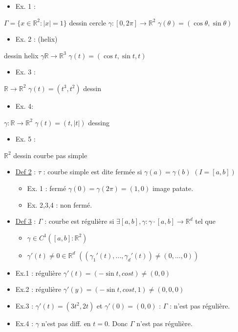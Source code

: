 \documentclass[11pt]{article}
\begin{document}
\begin{itemize}
\item Ex. 1 :
\end{itemize}
\(\Gamma = \{ x \in \mathbb{R}^2 : |x|=1\}\)
dessin cercle \(\gamma: \left[0,2\pi\right] \rightarrow \mathbb{R}^2\) \(\gamma(\theta) = (\cos \theta, \sin \theta)\)
\begin{itemize}
\item Ex. 2 : (helix)
\end{itemize}
dessin helix \(\gamma \mathbb{R} \rightarrow \mathbb{R}^3\) \(\gamma(t) = (\cos t, \sin t,t)\)
\begin{itemize}
\item Ex. 3 :
\end{itemize}
\(\mathbb{R} \rightarrow \mathbb{R}^2\)
\(\gamma(t) = (t^3,t^2)\)
dessin
\begin{itemize}
\item Ex. 4:
\end{itemize}
\(\gamma : \mathbb{R} \rightarrow \mathbb{R}^2\)
\(\gamma(t) = (t,|t|)\)
dessing
\begin{itemize}
\item Ex. 5 :
\end{itemize}
\(\mathbb{R}^2\) dessin courbe pas simple

\begin{itemize}
\item \uline{Def 2} : \(\tau\) : courbe simple est dite fermée si \(\gamma(a) = \gamma(b)\) \(\left(I = \left[a,b\right]\right)\)
\begin{itemize}
\item Ex. 1 : fermé \(\gamma(0)=\gamma(2\pi) = (1,0)\) image patate.
\item Ex. 2,3,4 : non fermé.
\end{itemize}

\item \uline{Def 3} : \(\Gamma\) : courbe est régulière si \(\exists \left[a,b\right], \gamma: \gamma \cdot \left[a,b\right] \rightarrow \mathbb{R}^d\) tel que
\begin{itemize}
\item \(\gamma \in C^1 \left(\left[a,b\right]: \mathbb{R}^2\right)\)
\item \(\gamma ' (t) \neq 0 \in \mathbb{R}^d\) \(\left( \left(\gamma_1'(t),...,\gamma_d'(t) \right) \neq (0,...,0) \right)\)
\end{itemize}

\item Ex.1 : régulière \(\gamma'(t) = (-\sin t, cos t) \neq (0,0)\)
\item Ex.2 : régulière \(\gamma'(y) = (-\sin t, cos t, 1) \neq (0,0,0)\)
\item Ex.3 : \(\gamma' (t) = (3t^2,2t)\) et \(\gamma'(0) = (0,0)\) : \(\Gamma\) : n'est pas régulière.
\item Ex.4 : \(\gamma\) n'est pas diff. en \(t=0\). Donc \(\Gamma\) n'est pas régulière.
\end{itemize}
\end{document}
